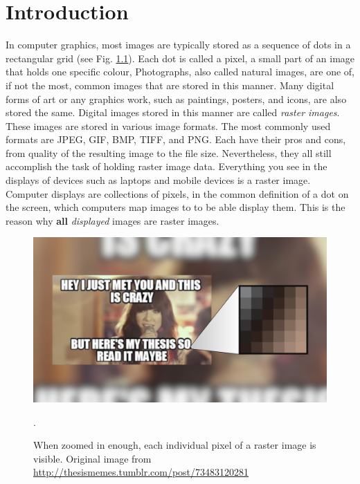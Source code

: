 \chapter{Introduction} \label{sec:intro}

In computer graphics, most images are typically stored as a sequence of dots in a rectangular grid (see Fig. \ref{fig:raster-images-upcose}). Each dot is called a pixel, a small part of an image that holds one specific colour, Photographs, also called natural images\cite{hoshyari2018perceptiondriven}, are one of, if not the most, common images that are stored in this manner. Many digital forms of art or any graphics work, such as paintings, posters, and icons, are also stored the same. Digital images stored in this manner are called \textit{raster images}. These images are stored in various image formats. The most commonly used formats are JPEG, GIF, BMP, TIFF, and PNG. Each have their pros and cons, from quality of the resulting image to the file size. Nevertheless, they all still accomplish the task of holding raster image data. Everything you see in the displays of devices such as laptops and mobile devices is a raster image. Computer displays are collections of pixels, in the common definition of a dot on the screen, which computers map images to to be able display them. This is the reason why \textbf{all} \textit{displayed} images are raster images.

\begin{figure}[h]
	\centering
	\includegraphics[scale=1.0]{images/chap01-introduction/raster-images-upclose.png}
	\caption{When zoomed in enough, each individual pixel of a raster image is visible. Original image from \protect\url{http://thesismemes.tumblr.com/post/73483120281}}.
	\label{fig:raster-images-upcose}
\end{figure}

